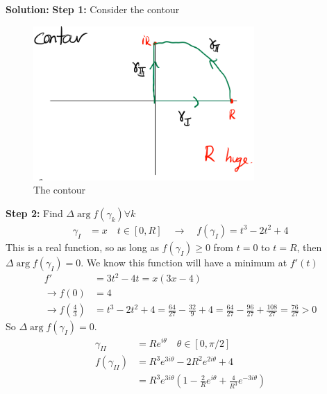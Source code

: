 \begin{example}
    \textbf{Solution:}
    \textbf{Step 1:} Consider the contour
    \begin{figure}[h]
        \centering
        \includegraphics[width=0.75\textwidth]{LECTURE_13/first-quadrant-contour.png}
        \caption{The contour}
    \end{figure}
    \textbf{Step 2:} Find $\Delta \arg f(\gamma_k) \forall k$
    \begin{align*}
        \gamma_I & = x \quad t \in [0, R] \quad \rightarrow\quad f(\gamma_I) = t^3 - 2t^2 + 4
    \end{align*}
    This is a real function, so as long as $f(\gamma_I) \geq 0$ from $t = 0$ to $t = R$, then $\Delta \arg f(\gamma_I) = 0$. We know this function will have a minimum at $f'(t)$
    \begin{align*}
        f'                       & = 3t^2 - 4t = x(3x - 4)                                                                                                  \\
        \rightarrow f(0)         & = 4                                                                                                                      \\
        \rightarrow f(\frac{4}3) & = t^3 - 2t^2 + 4 = \frac{64}{27} - \frac{32}{9} + 4 = \frac{64}{27} - \frac{96}{27} + \frac{108}{27} = \frac{76}{27} > 0
    \end{align*}
    So $\Delta \arg f(\gamma_I) = 0$.
    \begin{align*}
        \gamma_{II}    & = Re^{i\theta}\quad \theta \in [0, \pi/2]                                             \\
        f(\gamma_{II}) & = R^3e^{3i\theta} - 2R^2e^{2i\theta} + 4                                              \\
                       & = R^3e^{3i\theta}\left(1 - \frac{2}{R}e^{i\theta} + \frac{4}{R^3}e^{-3i\theta}\right) \\

\end{align*}
\end{example}
